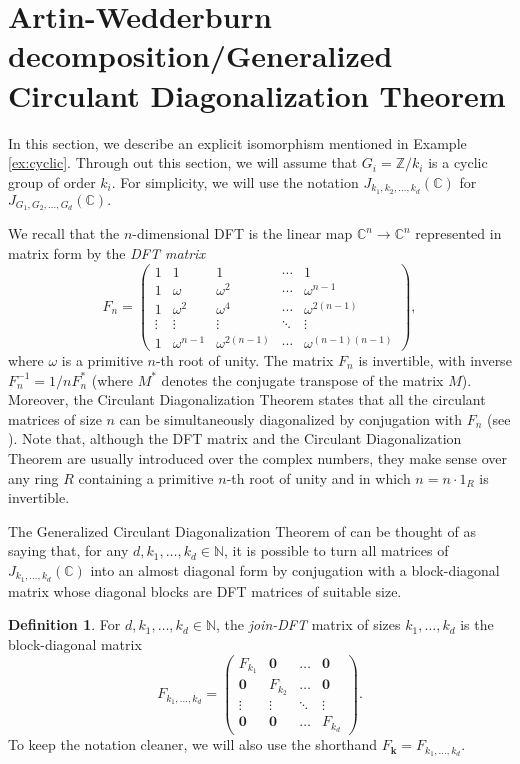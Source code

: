 \documentclass[12pt, a4paper]{amsart}
\numberwithin{equation}{section} %
\theoremstyle{plain}
\theoremstyle{definition}
\newtheorem{defn}[thm]{Definition}
\theoremstyle{plain}
\theoremstyle{remark}
\newcommand{\C}{\mathbb{C}}
\newcommand{\Z}{\mathbb{Z}}
\newcommand{\N}{\mathbb{N}}
\begin{document}
\section{Artin-Wedderburn decomposition/Generalized Circulant Diagonalization Theorem}
In this section, we describe an explicit isomorphism mentioned in Example \ref{ex:cyclic}. Through out this section, we will assume that $G_i = \Z/k_i$ is a cyclic group of order $k_i$. For simplicity, we will use the notation  $J_{k_1, k_2, \ldots, k_d}(\C)$ for $J_{G_1, G_2, \ldots, G_d}(\C).$

We recall that the $n$-dimensional DFT is the linear map $\C^n\to \C^n$ represented in matrix form by the \textit{DFT matrix}
\[
F_n= \begin{pmatrix}
1&1&1&\cdots &1 \\
1&\omega&\omega^2&\cdots&\omega^{n-1} \\
1&\omega^2&\omega^4&\cdots&\omega^{2(n-1)}\\
\vdots&\vdots&\vdots&\ddots&\vdots\\
1&\omega^{n-1}&\omega^{2(n-1)}&\cdots&\omega^{(n-1)(n-1)}
\end{pmatrix},
\]
where $\omega$ is a primitive $n$-th root of unity. The matrix $F_n$ is invertible, with inverse $F_n^{-1}=1/n F_n^*$ (where $M^*$ denotes the conjugate transpose of the matrix $M$).
Moreover, the Circulant Diagonalization Theorem  states that all the circulant matrices of size $n$ can be simultaneously diagonalized by conjugation with $F_n$ (see \cite[Theorem 3.2.1]{davis2013circulant}).
Note that, although the DFT matrix and the Circulant Diagonalization Theorem are usually introduced over the complex numbers, they make sense over any ring $R$ containing a primitive $n$-th root of unity and in which $n=n\cdot 1_R$ is invertible.

The Generalized Circulant Diagonalization Theorem of \cite{CM1} can be thought of as saying that, for any $d,k_1,\dots,k_d\in\N$, it is possible to turn all matrices of $J_{k_1,\dots,k_d}(\C)$ into an almost diagonal form by conjugation with a block-diagonal matrix whose diagonal blocks are DFT matrices of suitable size.
\begin{defn}
For $d,k_1,\dots,k_d\in\N$, the \textit{join-DFT} matrix of sizes $k_1,\dots,k_d$ is the block-diagonal matrix
\[
F_{k_1,\dots,k_d}=\left(\begin{array}{c|c|c|c}
F_{k_1} & \mathbf{0} & \dots & \mathbf{0}\\
\hline
\mathbf{0} & F_{k_2} & \dots & \mathbf{0}\\
\hline
\vdots & \vdots & \ddots & \vdots\\
\hline
\mathbf{0} & \mathbf{0} & \dots & F_{k_d}
\end{array}
\right).
\]
To keep the notation cleaner, we will also use the shorthand $F_{\mathbf{k}}=F_{k_1,\dots,k_d}$.
\end{defn}
\end{document}

